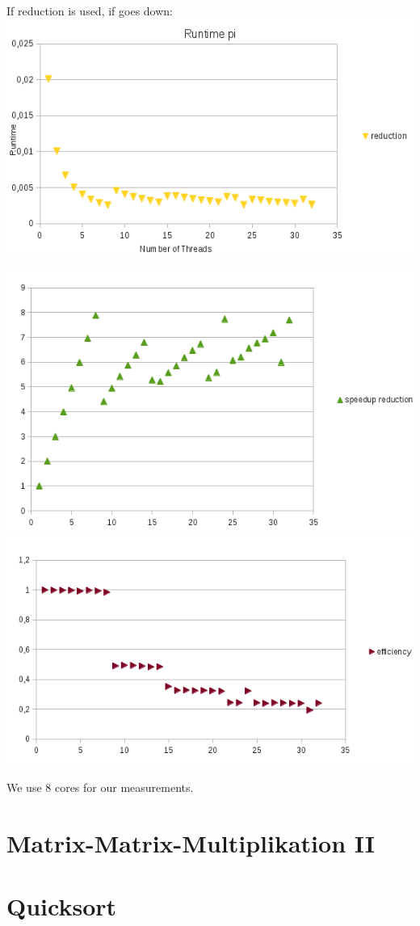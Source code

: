 \documentclass[a4paper,10pt]{article}
\begin{document}
If reduction is used, if goes down:
\includegraphics[]{pi_reduction.png}


\includegraphics[]{pi_speedup.png}
\includegraphics[]{pi_efficiency.png}

We use 8 cores for our measurements.

\section{Matrix-Matrix-Multiplikation II}

\section{Quicksort}
\end{document}

